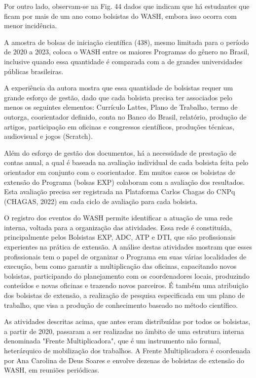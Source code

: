 Por outro lado, observam-se na Fig. 44 dados que indicam que há estudantes que ficam por mais de um ano como bolsistas do WASH, embora isso ocorra com menor incidência.

A amostra de bolsas de iniciação científica (438), mesmo limitada para o período de 2020 a 2023, coloca o WASH entre os maiores Programas do gênero no Brasil, inclusive quando essa quantidade é comparada com a de grandes universidades públicas brasileiras.

A experiência da autora mostra que essa quantidade de bolsistas requer um grande esforço de gestão, dado que cada bolsista precisa ter associados pelo menos os seguintes elementos: Currículo Lattes, Plano de Trabalho, termo de outorga, coorientador definido, conta no Banco do Brasil, relatório, produção de artigos, participação em oficinas e congressos científicos, produções técnicas, audiovisual e jogos (Scratch).

Além do esforço de gestão dos documentos, há a necessidade de prestação de contas anual, a qual é baseada na avaliação individual de cada bolsista feita pelo orientador em conjunto com o coorientador. Em muitos casos os bolsistas de extensão do Programa (bolsas EXP) colaboram com a avaliação dos resultados. Esta avaliação precisa ser registrada na Plataforma Carlos Chagas do CNPq (CHAGAS, 2022) em cada ciclo de avaliação para cada bolsista.

O registro dos eventos do WASH permite identificar a atuação de uma rede interna, voltada para a organização das atividades. Essa rede é constituída, principalmente pelos  Bolsistas EXP, ADC, ATP e DTI, que são profissionais experientes na prática de extensão. A análise destas atividades mostram que esses profissionais tem o papel de organizar o Programa em suas várias localidades de execução, bem como garantir a multiplicação das oficinas, capacitando novos bolsistas, participando do planejamento com os coordenadores locais, produzindo conteúdos e novas oficinas e trazendo novos parceiros. É também uma atribuição dos bolsistas de extensão, a realização de pesquisa especificada em um plano de trabalho, que visa a produção de conhecimento baseado no método científico.

As atividades descritas acima, que antes eram distribuídas por todos os bolsistas, a partir de 2020, passaram a ser realizadas no âmbito de uma estrutura interna denominada "Frente Multiplicadora", que é um instrumento não formal, heterárquico de mobilização dos trabalhos. A Frente Multiplicadora é coordenada por Ana Carolina de Deus Soares e envolve dezenas de bolsistas de extensão do WASH, em reuniões periódicas.

